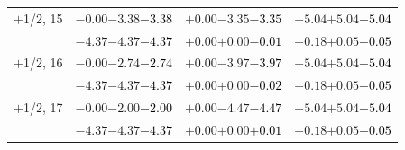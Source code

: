 \documentclass[compress]{beamer}
\begin{document}
\begin{frame}
\begin{tabular}{r | c | c | c}
$+$1/2, 15 & $-0.00$\hspace{0.1 cm}$-3.38$\hspace{0.1 cm}\textcolor{black}{$-3.38$} & $+0.00$\hspace{0.1 cm}$-3.35$\hspace{0.1 cm}\textcolor{black}{$-3.35$} & $+5.04$\hspace{0.1 cm}$+5.04$\hspace{0.1 cm}\textcolor{black}{$+5.04$} \\
           & $-4.37$\hspace{0.1 cm}$-4.37$\hspace{0.1 cm}\textcolor{black}{$-4.37$} & $+0.00$\hspace{0.1 cm}$+0.00$\hspace{0.1 cm}\textcolor{black}{$-0.01$} & $+0.18$\hspace{0.1 cm}$+0.05$\hspace{0.1 cm}\textcolor{black}{$+0.05$} \\
$+$1/2, 16 & $-0.00$\hspace{0.1 cm}$-2.74$\hspace{0.1 cm}\textcolor{black}{$-2.74$} & $+0.00$\hspace{0.1 cm}$-3.97$\hspace{0.1 cm}\textcolor{black}{$-3.97$} & $+5.04$\hspace{0.1 cm}$+5.04$\hspace{0.1 cm}\textcolor{black}{$+5.04$} \\
           & $-4.37$\hspace{0.1 cm}$-4.37$\hspace{0.1 cm}\textcolor{black}{$-4.37$} & $+0.00$\hspace{0.1 cm}$+0.00$\hspace{0.1 cm}\textcolor{black}{$-0.02$} & $+0.18$\hspace{0.1 cm}$+0.05$\hspace{0.1 cm}\textcolor{black}{$+0.05$} \\
$+$1/2, 17 & $-0.00$\hspace{0.1 cm}$-2.00$\hspace{0.1 cm}\textcolor{black}{$-2.00$} & $+0.00$\hspace{0.1 cm}$-4.47$\hspace{0.1 cm}\textcolor{black}{$-4.47$} & $+5.04$\hspace{0.1 cm}$+5.04$\hspace{0.1 cm}\textcolor{black}{$+5.04$} \\
           & $-4.37$\hspace{0.1 cm}$-4.37$\hspace{0.1 cm}\textcolor{black}{$-4.37$} & $+0.00$\hspace{0.1 cm}$+0.00$\hspace{0.1 cm}\textcolor{black}{$+0.01$} & $+0.18$\hspace{0.1 cm}$+0.05$\hspace{0.1 cm}\textcolor{black}{$+0.05$} \\

\end{tabular}
\end{frame}
\end{document}
